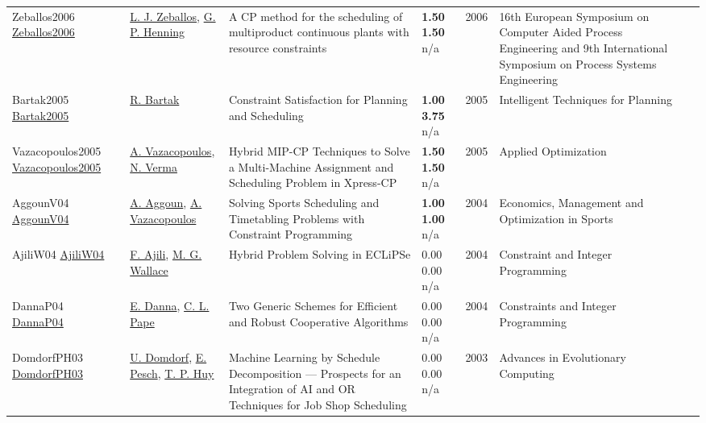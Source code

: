 {\begin{longtable}{p{3cm}p{5cm}p{10cm}p{1cm}rp{2.5cm}l}
Zeballos2006 \href{http://dx.doi.org/10.1016/s1570-7946(06)80335-4}{Zeballos2006} & \hyperref[auth:a621]{L. J. Zeballos}, \hyperref[auth:a588]{G. P. Henning} & A CP method for the scheduling of multiproduct continuous plants with resource constraints & \noindent{}\textbf{1.50} \textbf{1.50} n/a & 2006 & 16th European Symposium on Computer Aided Process Engineering and 9th International Symposium on Process Systems Engineering & \cite{Zeballos2006}\\
Bartak2005 \href{http://dx.doi.org/10.4018/978-1-59140-450-7.ch010}{Bartak2005} & \hyperref[auth:a1482]{R. Bartak} & Constraint Satisfaction for Planning and Scheduling & \noindent{}\textbf{1.00} \textbf{3.75} n/a & 2005 & Intelligent Techniques for Planning & \cite{Bartak2005}\\
Vazacopoulos2005 \href{http://dx.doi.org/10.1007/0-387-26281-4_12}{Vazacopoulos2005} & \hyperref[auth:a907]{A. Vazacopoulos}, \hyperref[auth:a1562]{N. Verma} & Hybrid MIP-CP Techniques to Solve a Multi-Machine Assignment and Scheduling Problem in Xpress-CP & \noindent{}\textbf{1.50} \textbf{1.50} n/a & 2005 & Applied Optimization & \cite{Vazacopoulos2005}\\
AggounV04 \href{http://dx.doi.org/10.1007/978-3-540-24734-0_15}{AggounV04} & \hyperref[auth:a725]{A. Aggoun}, \hyperref[auth:a907]{A. Vazacopoulos} & Solving Sports Scheduling and Timetabling Problems with Constraint Programming & \noindent{}\textbf{1.00} \textbf{1.00} n/a & 2004 & Economics, Management and Optimization in Sports & \cite{AggounV04}\\
AjiliW04 \href{http://dx.doi.org/10.1007/978-1-4419-8917-8_6}{AjiliW04} & \hyperref[auth:a949]{F. Ajili}, \hyperref[auth:a117]{M. G. Wallace} & Hybrid Problem Solving in ECLiPSe & \noindent{}\textcolor{black!50}{0.00} \textcolor{black!50}{0.00} n/a & 2004 & Constraint and Integer Programming & \cite{AjiliW04}\\
DannaP04 \href{http://dx.doi.org/10.1007/978-1-4419-8917-8_2}{DannaP04} & \hyperref[auth:a287]{E. Danna}, \hyperref[auth:a163]{C. L. Pape} & Two Generic Schemes for Efficient and Robust Cooperative Algorithms & \noindent{}\textcolor{black!50}{0.00} \textcolor{black!50}{0.00} n/a & 2004 & Constraints and Integer Programming & \cite{DannaP04}\\
DomdorfPH03 \href{http://dx.doi.org/10.1007/978-3-642-18965-4_31}{DomdorfPH03} & \hyperref[auth:a959]{U. Domdorf}, \hyperref[auth:a438]{E. Pesch}, \hyperref[auth:a960]{T. P. Huy} & Machine Learning by Schedule Decomposition — Prospects for an Integration of AI and OR Techniques for Job Shop Scheduling & \noindent{}\textcolor{black!50}{0.00} \textcolor{black!50}{0.00} n/a & 2003 & Advances in Evolutionary Computing & \cite{DomdorfPH03}\\

\end{longtable}}
